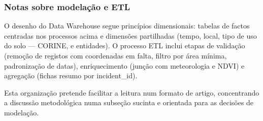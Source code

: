 \subsubsection{Notas sobre modelação e ETL}
O desenho do Data Warehouse segue princípios dimensionais: tabelas de factos centradas nos processos acima e dimensões partilhadas (tempo, local, tipo de uso do solo — CORINE, e entidades). O processo ETL inclui etapas de validação (remoção de registos com coordenadas em falta, filtro por área mínima, padronização de datas), enriquecimento (junção com meteorologia e NDVI) e agregação (fichas resumo por incident\_id).

Esta organização pretende facilitar a leitura num formato de artigo, concentrando a discussão metodológica numa subseção sucinta e orientada para as decisões de modelação.
